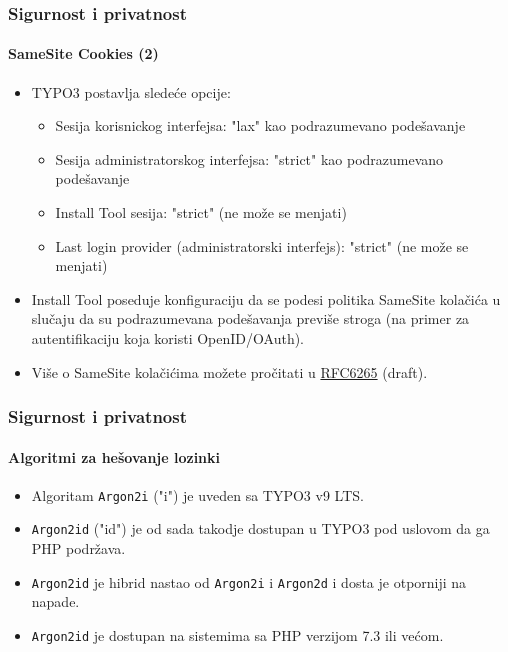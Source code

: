 
\begin{frame}[fragile]
	\frametitle{Sigurnost i privatnost}
	\framesubtitle{SameSite Cookies (2)}

	\begin{itemize}
		\item TYPO3 postavlja sledeće opcije:

			\begin{itemize}\small
				\item Sesija korisnickog interfejsa: "lax" kao podrazumevano podešavanje
				\item Sesija administratorskog interfejsa: "strict" kao podrazumevano podešavanje
				\item Install Tool sesija: "strict" (ne može se menjati)
				\item Last login provider (administratorski interfejs): "strict" (ne može se menjati)
			\end{itemize}\normalsize

		\item Install Tool poseduje konfiguraciju da se podesi politika
			SameSite kolačića u slučaju da su podrazumevana podešavanja previše stroga
			(na primer za autentifikaciju koja koristi OpenID/OAuth).

		\item Više o SameSite kolačićima možete pročitati u
			\href{https://tools.ietf.org/html/draft-ietf-httpbis-cookie-same-site-00}{RFC6265} (draft).
	\end{itemize}

\end{frame}


\begin{frame}[fragile]
	\frametitle{Sigurnost i privatnost}
	\framesubtitle{Algoritmi za hešovanje lozinki}

	\begin{itemize}
		\item Algoritam \texttt{Argon2i} ("i") je uveden sa TYPO3 v9 LTS.
		\item \texttt{Argon2id} ("id") je od sada takodje dostupan u TYPO3 pod uslovom da ga PHP podržava.
		\item \texttt{Argon2id} je hibrid nastao od \texttt{Argon2i} i \texttt{Argon2d}
			i dosta je otporniji na napade.
		\item \texttt{Argon2id} je dostupan na sistemima sa PHP verzijom 7.3 ili većom.
	\end{itemize}

\end{frame}

